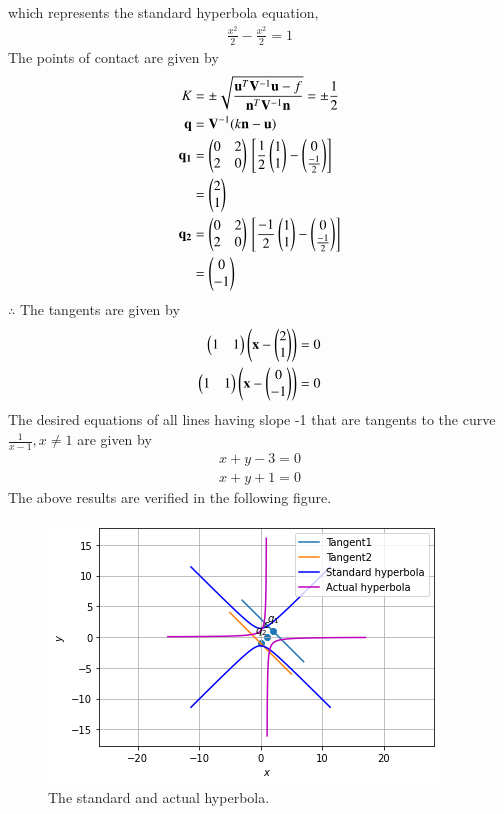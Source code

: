 \documentclass[journal,12pt,twocolumn]{IEEEtran}
\begin{document}
which represents the standard hyperbola equation,
\begin{align}
	\frac{x^2}{2} - \frac{x^2}{2} = 1
\end{align}
The points of contact are given by 
\begin{align}
  \tiny{K} &=\pm \sqrt{\frac{\mathbf{u}^T\mathbf{V}^{-1}\mathbf{u} - f}{\mathbf{n}^T\mathbf{V}^{-1}\mathbf{n}}}
  = \pm \frac{1}{2}\\
  \mathbf{q} &= \mathbf{V}^{-1}(k\mathbf{n}-\mathbf{u})\\
  \mathbf{q_1} &= \begin{pmatrix}0 & 2\\2 & 0\end{pmatrix} {}\left[\frac{1}{2}\begin{pmatrix}1 \\ 1\end{pmatrix} - \begin{pmatrix}0\\ \frac{-1}{2}\end{pmatrix}\right]\\
  &= \begin{pmatrix}2 \\ 1\end{pmatrix}\\
  \mathbf{q_2} &= \begin{pmatrix}0 & 2\\2 & 0\end{pmatrix} {}\left[\frac{-1}{2}\begin{pmatrix}1 \\ 1\end{pmatrix} - \begin{pmatrix}0\\ \frac{-1}{2}\end{pmatrix}\right]\\
  &= \begin{pmatrix}0 \\ -1\end{pmatrix}
\end{align} 
$\therefore$ The tangents are given by
\begin{align}
	\begin{pmatrix}1 & 1\end{pmatrix} \left(\mathbf{x} - \begin{pmatrix}2 \\ 1\end{pmatrix}\right) = 0 \\
	\begin{pmatrix}1 & 1\end{pmatrix} \left(\mathbf{x} - \begin{pmatrix}0 \\ -1\end{pmatrix}\right) = 0
\end{align}
The desired equations of all lines having slope -1 that are tangents to the curve $\frac{1}{x-1}, x \neq 1$ are given by
\begin{align}
	x + y - 3 = 0\\
	x + y + 1 = 0
\end{align}
The above results are verified in the following figure.
\begin{figure}[h!] \label{fig:tangents}
	\centering
	\includegraphics[width=\columnwidth]{graph7.png}
	\caption{The standard and actual hyperbola.}
\end{figure}
\end{document}
